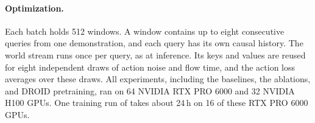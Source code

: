 \paragraph{Optimization.}
Each batch holds 512 windows. A window contains up to eight consecutive queries from
one demonstration, and each query has its own causal history. The world stream runs
once per query, as at inference. Its keys and values are reused for eight independent
draws of action noise and flow time, and the action loss averages over these draws.
All experiments, including the baselines, the ablations, and DROID pretraining, ran on
64 NVIDIA RTX PRO 6000 and 32 NVIDIA H100 GPUs. One training run of \ours takes about
24\,h on 16 of these RTX PRO 6000 GPUs.
